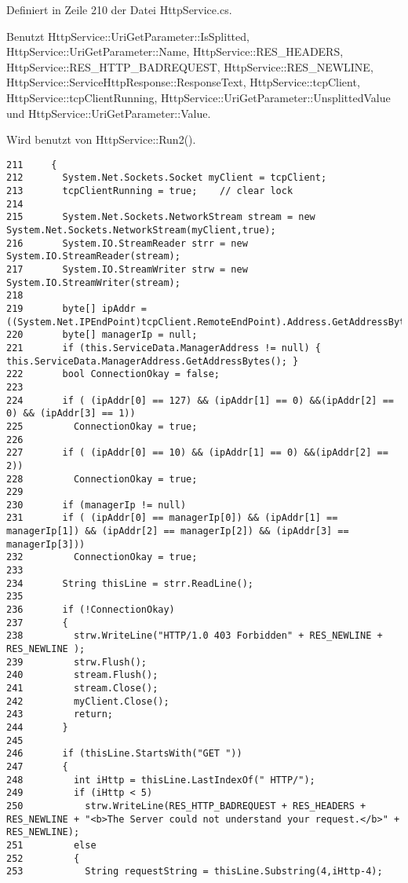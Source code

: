 Definiert in Zeile 210 der Datei Http\-Service.cs.

Benutzt Http\-Service::Uri\-Get\-Parameter::Is\-Splitted, Http\-Service::Uri\-Get\-Parameter::Name, Http\-Service::RES\_\-HEADERS, Http\-Service::RES\_\-HTTP\_\-BADREQUEST, Http\-Service::RES\_\-NEWLINE, Http\-Service::Service\-Http\-Response::Response\-Text, Http\-Service::tcp\-Client, Http\-Service::tcp\-Client\-Running, Http\-Service::Uri\-Get\-Parameter::Unsplitted\-Value und Http\-Service::Uri\-Get\-Parameter::Value.

Wird benutzt von Http\-Service::Run2().



\footnotesize\begin{verbatim}211     {
212       System.Net.Sockets.Socket myClient = tcpClient;
213       tcpClientRunning = true;    // clear lock
214 
215       System.Net.Sockets.NetworkStream stream = new System.Net.Sockets.NetworkStream(myClient,true);
216       System.IO.StreamReader strr = new System.IO.StreamReader(stream);
217       System.IO.StreamWriter strw = new System.IO.StreamWriter(stream);
218 
219       byte[] ipAddr = ((System.Net.IPEndPoint)tcpClient.RemoteEndPoint).Address.GetAddressBytes();
220       byte[] managerIp = null; 
221       if (this.ServiceData.ManagerAddress != null) { this.ServiceData.ManagerAddress.GetAddressBytes(); }
222       bool ConnectionOkay = false;
223 
224       if ( (ipAddr[0] == 127) && (ipAddr[1] == 0) &&(ipAddr[2] == 0) && (ipAddr[3] == 1))
225         ConnectionOkay = true;
226 
227       if ( (ipAddr[0] == 10) && (ipAddr[1] == 0) &&(ipAddr[2] == 2))
228         ConnectionOkay = true;
229 
230       if (managerIp != null)
231       if ( (ipAddr[0] == managerIp[0]) && (ipAddr[1] == managerIp[1]) && (ipAddr[2] == managerIp[2]) && (ipAddr[3] == managerIp[3]))
232         ConnectionOkay = true;
233 
234       String thisLine = strr.ReadLine();
235 
236       if (!ConnectionOkay)
237       {
238         strw.WriteLine("HTTP/1.0 403 Forbidden" + RES_NEWLINE + RES_NEWLINE );
239         strw.Flush();
240         stream.Flush();
241         stream.Close();
242         myClient.Close();
243         return;
244       }
245 
246       if (thisLine.StartsWith("GET "))
247       {
248         int iHttp = thisLine.LastIndexOf(" HTTP/");
249         if (iHttp < 5)
250           strw.WriteLine(RES_HTTP_BADREQUEST + RES_HEADERS + RES_NEWLINE + "<b>The Server could not understand your request.</b>" + RES_NEWLINE);
251         else
252         {
253           String requestString = thisLine.Substring(4,iHttp-4);

\end{verbatim}
